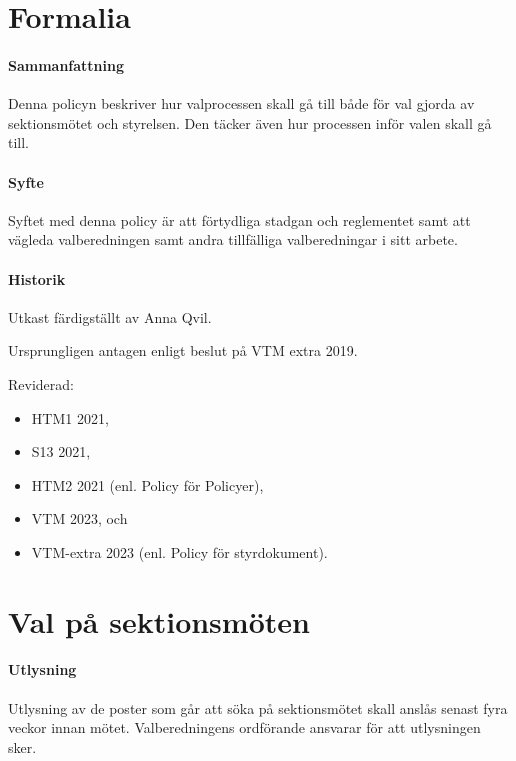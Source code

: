 \documentclass{dsekpolicy}
\begin{document}
\maketitle
\section{Formalia}

\paragraph{Sammanfattning}
Denna policyn beskriver hur valprocessen skall gå till både för val gjorda av
sektionsmötet och styrelsen. Den täcker även hur processen inför valen skall gå
till.

\paragraph{Syfte}
Syftet med denna policy är att förtydliga stadgan och reglementet samt att
vägleda valberedningen samt andra tillfälliga valberedningar i sitt arbete.

\paragraph{Historik}
Utkast färdigställt av Anna Qvil.

Ursprungligen antagen enligt beslut på VTM extra 2019.

Reviderad:
\begin{itemize}
\item HTM1 2021,
\item S13 2021,
\item HTM2 2021 (enl. Policy för Policyer),
\item VTM 2023, och
\item VTM-extra 2023 (enl. Policy för styrdokument).
\end{itemize}

\section{Val på sektionsmöten}

\paragraph{Utlysning}
Utlysning av de poster som går att söka på sektionsmötet skall anslås senast
fyra veckor innan mötet. Valberedningens ordförande ansvarar för att utlysningen
sker.
\end{document}
